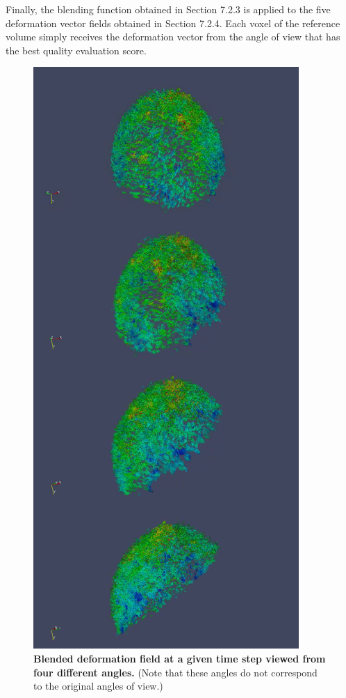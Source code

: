    Finally, the blending function obtained in Section 7.2.3 is applied to the five deformation vector fields obtained in Section 7.2.4. Each voxel of the reference volume simply receives the deformation vector from the angle of view that has the best quality evaluation score.  
\begin{figure}
\begin{center}
\includegraphics[width=0.9\textwidth]{../../images/Reconstruction/washington/blendingfunction_deffield.png}
\end{center}
\caption{\textbf{Blended deformation field at a given time step viewed from four different angles.} (Note that these angles do not correspond to the original angles of view.)}
\label{washington_blendingfunction_deffield}
\end{figure}
